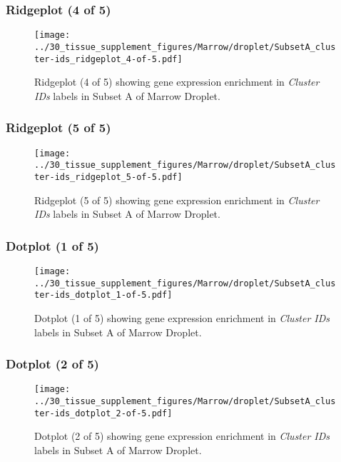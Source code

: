 \clearpage

\subsubsection{Ridgeplot (4 of 5)}
\begin{figure}[h]
\centering
\texttt{[image: ../30\_tissue\_supplement\_figures/Marrow/droplet/SubsetA\_cluster-ids\_ridgeplot\_4-of-5.pdf]}

\caption{ Ridgeplot (4 of 5)  showing gene expression enrichment in \emph{Cluster IDs} labels in Subset A of Marrow Droplet. }
\end{figure}


\clearpage

\subsubsection{Ridgeplot (5 of 5)}
\begin{figure}[h]
\centering
\texttt{[image: ../30\_tissue\_supplement\_figures/Marrow/droplet/SubsetA\_cluster-ids\_ridgeplot\_5-of-5.pdf]}

\caption{ Ridgeplot (5 of 5)  showing gene expression enrichment in \emph{Cluster IDs} labels in Subset A of Marrow Droplet. }
\end{figure}


\clearpage

\subsubsection{Dotplot (1 of 5)}
\begin{figure}[h]
\centering
\texttt{[image: ../30\_tissue\_supplement\_figures/Marrow/droplet/SubsetA\_cluster-ids\_dotplot\_1-of-5.pdf]}

\caption{ Dotplot (1 of 5)  showing gene expression enrichment in \emph{Cluster IDs} labels in Subset A of Marrow Droplet. }
\end{figure}


\clearpage

\subsubsection{Dotplot (2 of 5)}
\begin{figure}[h]
\centering
\texttt{[image: ../30\_tissue\_supplement\_figures/Marrow/droplet/SubsetA\_cluster-ids\_dotplot\_2-of-5.pdf]}

\caption{ Dotplot (2 of 5)  showing gene expression enrichment in \emph{Cluster IDs} labels in Subset A of Marrow Droplet. }
\end{figure}


